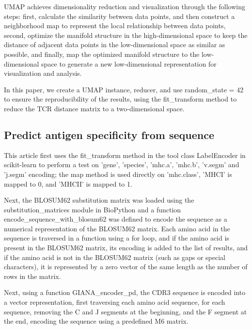 \documentclass[conference]{IEEEtran}
\begin{document}
	UMAP achieves dimensionality reduction and visualization through the following steps: first, calculate the similarity between data points, and then construct a neighborhood map to represent the local relationship between data points, second, optimize the manifold structure in the high-dimensional space to keep the distance of adjacent data points in the low-dimensional space as similar as possible, and finally, map the optimized manifold structure to the low-dimensional space to generate a new low-dimensional representation for visualization and analysis.
	
	In this paper, we create a UMAP instance, reducer, and use random\_state = 42 to ensure the reproducibility of the results, using the fit\_transform method to reduce the TCR distance matrix to a two-dimensional space.
	

	\subsection{Predict antigen specificity from sequence}
	
	This article first uses the fit\_transform method in the tool class LabelEncoder in scikit-learn to perform a test on 'gene', 'species', 'mhc.a', 'mhc.b', 'v.segm' and 'j.segm' encoding; the map method is used directly on 'mhc.class', 'MHCI' is mapped to 0, and 'MHCII' is mapped to 1.
	
	Next, the BLOSUM62 substitution matrix was loaded using the substitution\_matrices module in BioPython and a function encode\_sequence\_with\_blosum62 was defined to encode the sequence as a numerical representation of the BLOSUM62 matrix. Each amino acid in the sequence is traversed in a function using a for loop, and if the amino acid is present in the BLOSUM62 matrix, its encoding is added to the list of results, and if the amino acid is not in the BLOSUM62 matrix (such as gaps or special characters), it is represented by a zero vector of the same length as the number of rows in the matrix.
	
	Next, using a function GIANA\_encoder\_pd, the CDR3 sequence is encoded into a vector representation, first traversing each amino acid sequence, for each sequence, removing the C and J segments at the beginning, and the F segment at the end, encoding the sequence using a predefined M6 matrix.
	
\end{document}
